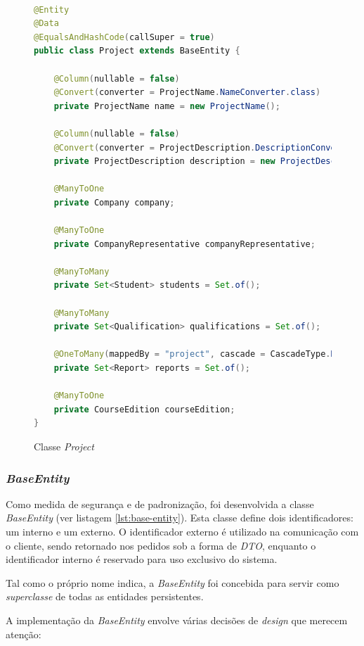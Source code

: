 \begin{figure}
    \centering
    
    \begin{lstlisting}[language=Java]

@Entity
@Data
@EqualsAndHashCode(callSuper = true)
public class Project extends BaseEntity {

    @Column(nullable = false)
    @Convert(converter = ProjectName.NameConverter.class)
    private ProjectName name = new ProjectName();

    @Column(nullable = false)
    @Convert(converter = ProjectDescription.DescriptionConverter.class)
    private ProjectDescription description = new ProjectDescription();

    @ManyToOne
    private Company company;

    @ManyToOne
    private CompanyRepresentative companyRepresentative;

    @ManyToMany
    private Set<Student> students = Set.of();

    @ManyToMany
    private Set<Qualification> qualifications = Set.of();

    @OneToMany(mappedBy = "project", cascade = CascadeType.REMOVE)
    private Set<Report> reports = Set.of();

    @ManyToOne
    private CourseEdition courseEdition;
}

    \end{lstlisting}

    \caption{Classe \textit{Project}}
    \label{fig:classe-projeto}
\end{figure}

\subsubsection{\textit{BaseEntity}}
\label{sec:base-entity}

Como medida de segurança e de padronização, foi desenvolvida a classe \textit{BaseEntity} (ver listagem \ref{lst:base-entity}). Esta classe define dois identificadores: um interno e um externo. O identificador externo é utilizado na comunicação com o cliente, sendo retornado nos pedidos sob a forma de \textit{DTO}, enquanto o identificador interno é reservado para uso exclusivo do sistema.

Tal como o próprio nome indica, a \textit{BaseEntity} foi concebida para servir como \textit{superclasse} de todas as entidades persistentes.

A implementação da \textit{BaseEntity} envolve várias decisões de \textit{design} que merecem atenção:

